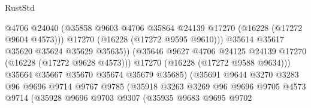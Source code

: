 \begin{lexlean}{RustStd}
\begin{coremodule}
                                          @4706
                                          @24040
                                          (@35858
                                            @9603
                                            @4706
                                            @35864
                                            @24139
                                            @17270
                                            (@16228 (@17272 @9604 @4573)))
                                          @17270
                                          (@16228 (@17272 @9595 @9610)))
                                        @35614
                                        @35617
                                        @35620
                                        @35624
                                        @35629
                                        @35635))
                                    (@35646
                                      @9627
                                      @4706
                                      @24125
                                      @24139
                                      @17270
                                      (@16228 (@17272 @9628 @4573)))
                                    @17270
                                    (@16228 (@17272 @9588 @9634)))
                                  @35664
                                  @35667
                                  @35670
                                  @35674
                                  @35679
                                  @35685)
                                (@35691
                                  @9644
                                  @3270
                                  @3283
                                  @96
                                  @9696
                                  @9714
                                  @9767
                                  @9785
                                  (@35918
                                    @3263
                                    @3269
                                    @96
                                    @9696
                                    @9705
                                    @4573
                                    @9714
                                    (@35928
                                      @9696
                                      @9703
                                      @9307
                                      (@35935
                                        @9683
                                        @9695
                                        @9702

\end{coremodule}
\end{lexlean}
